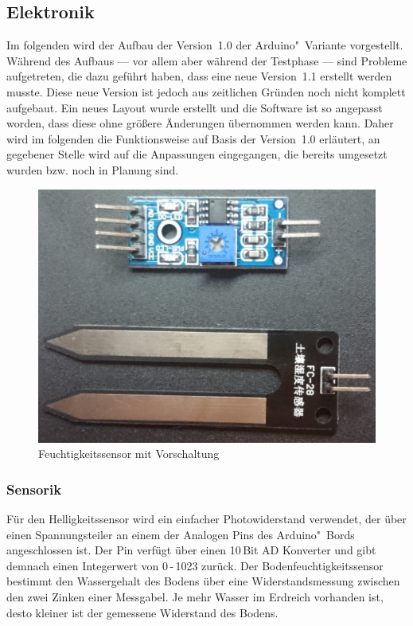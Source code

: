 \subsection{Elektronik}
Im folgenden wird der Aufbau der Version~1.0 der Arduino"~Variante vorgestellt. 
Während des Aufbaus --- vor allem aber während der Testphase --- sind Probleme aufgetreten, die dazu geführt haben, dass eine neue Version~1.1 erstellt werden musste. 
Diese neue Version ist jedoch aus zeitlichen Gründen noch nicht komplett aufgebaut. 
Ein neues Layout wurde erstellt und die Software ist so angepasst worden, dass diese ohne größere Änderungen übernommen werden kann. 
Daher wird im folgenden die Funktionsweise auf Basis der Version~1.0 erläutert, an gegebener Stelle wird auf die Anpassungen eingegangen, die bereits umgesetzt wurden bzw. noch in Planung sind. 

\begin{figure}[!h]
	\centering
	\includegraphics[width=0.9\linewidth]{bilder/_feuchteSensor1.jpg}
	\caption{Feuchtigkeitssensor mit Vorschaltung}
	\label{fig-SensorVorschaltung}
\end{figure}
			
\subsubsection{Sensorik} \label{sensorik}
Für den Helligkeitssensor wird ein einfacher Photowiderstand verwendet, der über einen Spannungsteiler an einem der Analogen Pins des Arduino"~Bords angeschlossen ist. Der Pin verfügt über einen 10\,Bit AD Konverter und gibt demnach einen Integerwert von 
0\,-\,1023 zurück.
Der Bodenfeuchtigkeitssensor bestimmt den Wassergehalt des Bodens über eine Widerstandsmessung zwischen den zwei Zinken einer Messgabel. 
Je mehr Wasser im Erdreich vorhanden ist, desto kleiner ist der gemessene Widerstand des Bodens.



